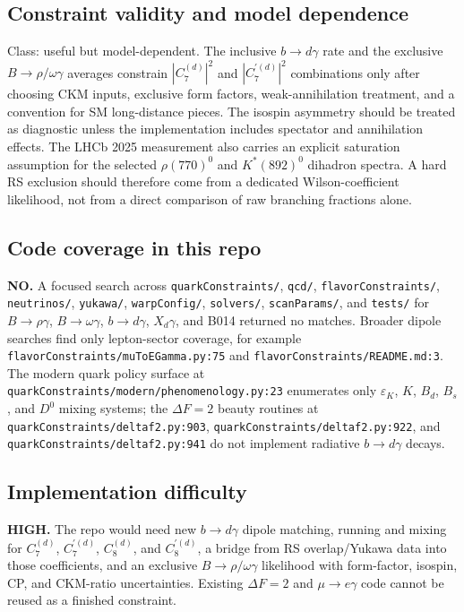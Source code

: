 \subsection*{Constraint validity and model dependence}
Class: useful but model-dependent.  The inclusive \(b\to d\gamma\) rate and
the exclusive \(B\to\rho/\omega\gamma\) averages constrain \(|C_7^{(d)}|^2\)
and \(|C_7^{\prime(d)}|^2\) combinations only after choosing CKM inputs,
exclusive form factors, weak-annihilation treatment, and a convention for SM
long-distance pieces.  The isospin asymmetry should be treated as diagnostic
unless the implementation includes spectator and annihilation effects.  The
LHCb 2025 measurement also carries an explicit saturation assumption for the
selected \(\rho(770)^0\) and \(K^{*}(892)^0\) dihadron spectra.  A hard RS
exclusion should therefore come from a dedicated Wilson-coefficient likelihood,
not from a direct comparison of raw branching fractions alone.

\subsection*{Code coverage in this repo}
\textbf{NO.}  A focused search across \texttt{quarkConstraints/},
\texttt{qcd/}, \texttt{flavorConstraints/}, \texttt{neutrinos/},
\texttt{yukawa/}, \texttt{warpConfig/}, \texttt{solvers/},
\texttt{scanParams/}, and \texttt{tests/} for \(B\to\rho\gamma\),
\(B\to\omega\gamma\), \(b\to d\gamma\), \(X_d\gamma\), and B014 returned no
matches.  Broader dipole searches find only lepton-sector coverage, for
example \texttt{flavorConstraints/muToEGamma.py:75} and
\texttt{flavorConstraints/README.md:3}.  The modern quark policy surface at
\texttt{quarkConstraints/modern/phenomenology.py:23} enumerates only
\(\varepsilon_K\), \(K\), \(B_d\), \(B_s\), and \(D^0\) mixing systems; the
\(\Delta F=2\) beauty routines at
\texttt{quarkConstraints/deltaf2.py:903},
\texttt{quarkConstraints/deltaf2.py:922}, and
\texttt{quarkConstraints/deltaf2.py:941} do not implement radiative
\(b\to d\gamma\) decays.

\subsection*{Implementation difficulty}
\textbf{HIGH.}  The repo would need new \(b\to d\gamma\) dipole matching,
running and mixing for \(C_7^{(d)}\), \(C_7^{\prime(d)}\), \(C_8^{(d)}\), and
\(C_8^{\prime(d)}\), a bridge from RS overlap/Yukawa data into those
coefficients, and an exclusive \(B\to\rho/\omega\gamma\) likelihood with
form-factor, isospin, CP, and CKM-ratio uncertainties.  Existing
\(\Delta F=2\) and \(\mu\to e\gamma\) code cannot be reused as a finished
constraint.

